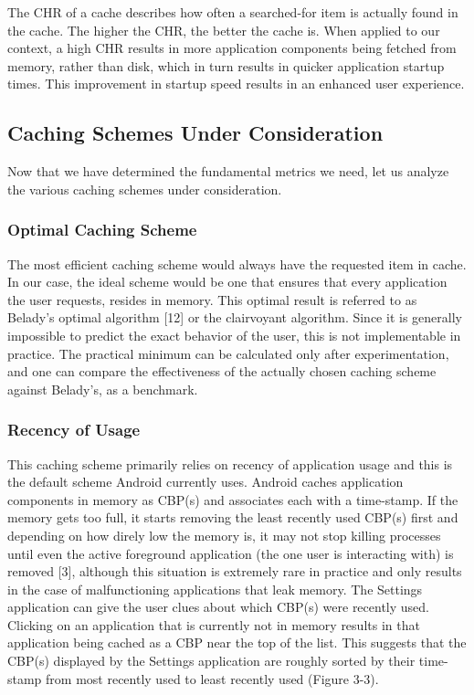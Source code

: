 \documentclass[12pt]{uthesis-v12}  %
\begin{document}
			The CHR of a cache describes how often a searched-for item is actually found in the cache. The higher the CHR, the better the cache is. When applied to our context, a high CHR results in more application components being fetched from memory, rather than disk, which in turn results in quicker application startup times. This improvement in startup speed results in an enhanced user experience.   
		
		\subsection{Caching Schemes Under Consideration}
			Now that we have determined the fundamental metrics we need, let us analyze the various caching schemes under consideration.
			
			\subsubsection{Optimal Caching Scheme}
				The most efficient caching scheme would always have the requested item in cache. In our case, the ideal scheme would be one that ensures that every application the user requests, resides in memory. This optimal result is referred to as Belady's optimal algorithm [12] or the clairvoyant algorithm. Since it is generally impossible to predict the exact behavior of the user, this is not implementable in practice. The practical minimum can be calculated only after experimentation, and one can compare the effectiveness of the actually chosen caching scheme against Belady's, as a benchmark.
			
			\subsubsection{Recency of Usage}
				This caching scheme primarily relies on recency of application usage and this is the default scheme Android currently uses. Android caches application components in memory as CBP(s) and associates each with a time-stamp. If the memory gets too full, it starts removing the least recently used CBP(s) first and depending on how direly low the memory is, it may not stop killing processes until even the active foreground application (the one user is interacting with) is removed [3], although this situation is extremely rare in practice and only results in the case of malfunctioning applications that leak memory. The Settings application can give the user clues about which CBP(s) were recently used. Clicking on an application that is currently not in memory results in that application being cached as a CBP near the top of the list. This suggests that the CBP(s) displayed by the Settings application are roughly sorted by their time-stamp from most recently used to least recently used (Figure 3-3). 
				
\end{document}
